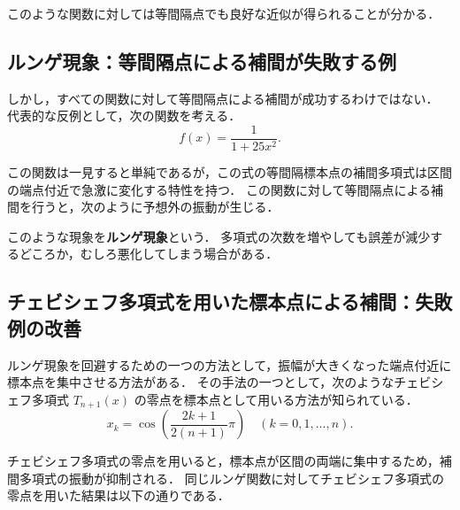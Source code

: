     \clearpage
    
\label{subsec:runge_phenomenon}
  
    このような関数に対しては等間隔点でも良好な近似が得られることが分かる．

  \subsection{ルンゲ現象：等間隔点による補間が失敗する例}
    しかし，すべての関数に対して等間隔点による補間が成功するわけではない．
    代表的な反例として，次の関数を考える．
    \[f(x) = \frac{1}{1 + 25x^2}.\]
    
    この関数は一見すると単純であるが，この式の等間隔標本点の補間多項式は区間の端点付近で急激に変化する特性を持つ．
    この関数に対して等間隔点による補間を行うと，次のように予想外の振動が生じる．
  
    \clearpage  
    

  \label{subsec:chebyshev_solution}
    このような現象を\textbf{ルンゲ現象}という．
    多項式の次数を増やしても誤差が減少するどころか，むしろ悪化してしまう場合がある．

  \subsection{チェビシェフ多項式を用いた標本点による補間：失敗例の改善}
    ルンゲ現象を回避するための一つの方法として，振幅が大きくなった端点付近に標本点を集中させる方法がある．
    その手法の一つとして，次のようなチェビシェフ多項式 $T_{n+1}(x)$ の零点を標本点として用いる方法が知られている．
    \begin{equation}
      x_k = \cos \left( \frac{2k + 1}{2(n + 1)} \pi \right) \quad (k = 0, 1, \dots, n).
    \end{equation}
    
    チェビシェフ多項式の零点を用いると，標本点が区間の両端に集中するため，補間多項式の振動が抑制される．
    同じルンゲ関数に対してチェビシェフ多項式の零点を用いた結果は以下の通りである．
    \clearpage
    

